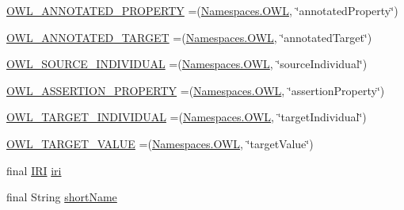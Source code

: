 \begin{DoxyCompactItemize}
\item 
\hyperlink{enumorg_1_1semanticweb_1_1owlapi_1_1vocab_1_1_o_w_l_r_d_f_vocabulary_a40ef544994bb8888211227803f8de767}{O\-W\-L\-\_\-\-A\-N\-N\-O\-T\-A\-T\-E\-D\-\_\-\-P\-R\-O\-P\-E\-R\-T\-Y} =(\hyperlink{enumorg_1_1semanticweb_1_1owlapi_1_1vocab_1_1_namespaces_a2fcb537074d9307ef1356ffb6a5bd6f4}{Namespaces.\-O\-W\-L}, \char`\"{}annotated\-Property\char`\"{})
\item 
\hyperlink{enumorg_1_1semanticweb_1_1owlapi_1_1vocab_1_1_o_w_l_r_d_f_vocabulary_adbaa1af09964ae243e359762a8371010}{O\-W\-L\-\_\-\-A\-N\-N\-O\-T\-A\-T\-E\-D\-\_\-\-T\-A\-R\-G\-E\-T} =(\hyperlink{enumorg_1_1semanticweb_1_1owlapi_1_1vocab_1_1_namespaces_a2fcb537074d9307ef1356ffb6a5bd6f4}{Namespaces.\-O\-W\-L}, \char`\"{}annotated\-Target\char`\"{})
\item 
\hyperlink{enumorg_1_1semanticweb_1_1owlapi_1_1vocab_1_1_o_w_l_r_d_f_vocabulary_a03dd52070fbc55526a11fb6e4c4eecc8}{O\-W\-L\-\_\-\-S\-O\-U\-R\-C\-E\-\_\-\-I\-N\-D\-I\-V\-I\-D\-U\-A\-L} =(\hyperlink{enumorg_1_1semanticweb_1_1owlapi_1_1vocab_1_1_namespaces_a2fcb537074d9307ef1356ffb6a5bd6f4}{Namespaces.\-O\-W\-L}, \char`\"{}source\-Individual\char`\"{})
\item 
\hyperlink{enumorg_1_1semanticweb_1_1owlapi_1_1vocab_1_1_o_w_l_r_d_f_vocabulary_a1c7f87ed221e653fc6e7bfa46b7952d6}{O\-W\-L\-\_\-\-A\-S\-S\-E\-R\-T\-I\-O\-N\-\_\-\-P\-R\-O\-P\-E\-R\-T\-Y} =(\hyperlink{enumorg_1_1semanticweb_1_1owlapi_1_1vocab_1_1_namespaces_a2fcb537074d9307ef1356ffb6a5bd6f4}{Namespaces.\-O\-W\-L}, \char`\"{}assertion\-Property\char`\"{})
\item 
\hyperlink{enumorg_1_1semanticweb_1_1owlapi_1_1vocab_1_1_o_w_l_r_d_f_vocabulary_ab25912e2f75876153947e38752287203}{O\-W\-L\-\_\-\-T\-A\-R\-G\-E\-T\-\_\-\-I\-N\-D\-I\-V\-I\-D\-U\-A\-L} =(\hyperlink{enumorg_1_1semanticweb_1_1owlapi_1_1vocab_1_1_namespaces_a2fcb537074d9307ef1356ffb6a5bd6f4}{Namespaces.\-O\-W\-L}, \char`\"{}target\-Individual\char`\"{})
\item 
\hyperlink{enumorg_1_1semanticweb_1_1owlapi_1_1vocab_1_1_o_w_l_r_d_f_vocabulary_a5525f7023e5ffab4f87849e8a2dab5db}{O\-W\-L\-\_\-\-T\-A\-R\-G\-E\-T\-\_\-\-V\-A\-L\-U\-E} =(\hyperlink{enumorg_1_1semanticweb_1_1owlapi_1_1vocab_1_1_namespaces_a2fcb537074d9307ef1356ffb6a5bd6f4}{Namespaces.\-O\-W\-L}, \char`\"{}target\-Value\char`\"{})
\item 
final \hyperlink{classorg_1_1semanticweb_1_1owlapi_1_1model_1_1_i_r_i}{I\-R\-I} \hyperlink{enumorg_1_1semanticweb_1_1owlapi_1_1vocab_1_1_o_w_l_r_d_f_vocabulary_aa071b3e49a37959eca1dabaad8aa1fa8}{iri}
\item 
final String \hyperlink{enumorg_1_1semanticweb_1_1owlapi_1_1vocab_1_1_o_w_l_r_d_f_vocabulary_a57d3a21e4214cca32546506ea3a5c750}{short\-Name}
\end{DoxyCompactItemize}
